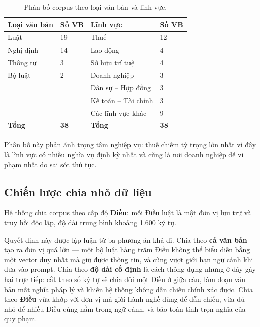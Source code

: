 \documentclass[12pt,a4paper]{report}
\numberwithin{equation}{chapter}
\numberwithin{figure}{chapter}
\numberwithin{table}{chapter}
\begin{document}
\begin{table}[htp]
    \centering
    \caption{Phân bố corpus theo loại văn bản và lĩnh vực.}
    \label{tab:corpus}
    \begin{tabular}{p{3.6cm}p{1.8cm}p{4.6cm}p{1.8cm}}
        \toprule
        \textbf{Loại văn bản} & \textbf{Số VB} & \textbf{Lĩnh vực} &
        \textbf{Số VB} \\
        \midrule
        Luật & 19 & Thuế & 12 \\
        Nghị định & 14 & Lao động & 4 \\
        Thông tư & 3 & Sở hữu trí tuệ & 4 \\
        Bộ luật & 2 & Doanh nghiệp & 3 \\
         & & Dân sự -- Hợp đồng & 3 \\
         & & Kế toán -- Tài chính & 3 \\
         & & Các lĩnh vực khác & 9 \\
        \midrule
        \textbf{Tổng} & \textbf{38} & \textbf{Tổng} & \textbf{38} \\
        \bottomrule
    \end{tabular}
\end{table}

Phân bố này phản ánh trọng tâm nghiệp vụ: thuế chiếm tỷ trọng lớn nhất vì đây là
lĩnh vực có nhiều nghĩa vụ định kỳ nhất và cũng là nơi doanh nghiệp dễ vi phạm
nhất do sai sót thủ tục.

\subsection{Chiến lược chia nhỏ dữ liệu}
\label{sec:chunking}

Hệ thống chia corpus theo cấp độ \textbf{Điều}: mỗi Điều luật là một đơn vị lưu
trữ và truy hồi độc lập, độ dài trung bình khoảng 1.600 ký tự.

Quyết định này được lập luận từ ba phương án khả dĩ. Chia theo \textbf{cả văn bản}
tạo ra đơn vị quá lớn --- một bộ luật hàng trăm Điều không thể biểu diễn bằng một
vector duy nhất mà giữ được thông tin, và cũng vượt giới hạn ngữ cảnh khi đưa vào
prompt. Chia theo \textbf{độ dài cố định} là cách thông dụng nhưng ở đây gây hại
trực tiếp: cắt theo số ký tự sẽ chia đôi một Điều ở giữa câu, làm đoạn văn bản mất
nghĩa pháp lý và khiến hệ thống không dẫn chiếu chính xác được. Chia theo
\textbf{Điều} vừa khớp với đơn vị mà giới hành nghề dùng để dẫn chiếu, vừa đủ nhỏ
để nhiều Điều cùng nằm trong ngữ cảnh, và bảo toàn tính trọn nghĩa của quy phạm.
\end{document}
